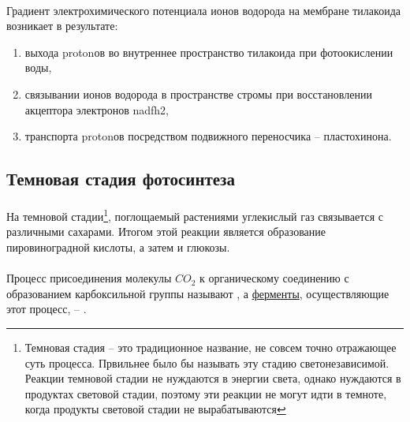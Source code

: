 \paragraph*{}Градиент электрохимического потенциала ионов водорода на мембране тилакоида возникает в результате: 

\begin{enumerate}

\item выхода \gls{proton}ов во внутреннее пространство тилакоида при фотоокислении воды, 
\item связывании ионов водорода в пространстве стромы при восстановлении акцептора электронов \gls{nadfh2}, 
\item транспорта \gls{proton}ов посредством подвижного переносчика – пластохинона.

\end{enumerate}


\subsection*{Темновая стадия фотосинтеза}

\paragraph*{}На темновой стадии\footnote{Темновая стадия -- это традиционное название, не совсем точно отражающее суть процесса. Првильнее было бы называть эту стадию светонезависимой. Реакции темновой стадии не нуждаются в энергии света, однако нуждаются в продуктах световой стадии, поэтому эти реакции не могут идти в темноте, когда продукты световой стадии не вырабатываются}, поглощаемый растениями углекислый газ связывается с различными сахарами. Итогом этой реакции является образование пировиноградной кислоты, а затем и глюкозы.

\paragraph*{}Процесс присоединения молекулы $CO_{2}$ к органическому соединению с образованием карбоксильной группы называют , а \hyperlink{enzimes}{ферменты}, осуществляющие этот процесс, -- . 

